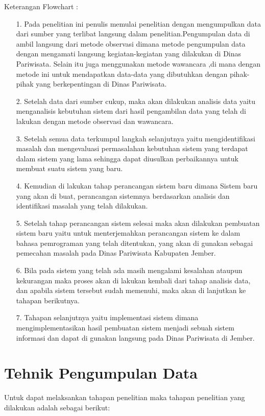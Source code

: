 \documentclass{jtetiproposalskripsi}
\begin{document}
Keterangan Flowchart :
\begin{itemize}
\item[1.] Pada penelitian  ini penulis memulai penelitian dengan mengumpulkan data dari sumber yang terlibat langsung dalam penelitian.Pengumpulan data di ambil langsung dari metode observasi dimana metode pengumpulan data dengan mengamati langsung kegiatan-kegiatan  yang dilakukan di Dinas Pariwisata. Selain itu juga menggunakan metode wawancara ,di mana dengan metode ini untuk mendapatkan data-data yang dibutuhkan dengan pihak-pihak yang berkepentingan di Dinas Pariwisata. 
\item[2.] Setelah data dari sumber cukup, maka akan dilakukan analisis data yaitu menganalisis  kebutuhan  sistem  dari hasil pengambilan data yang telah di lakukan dengan metode observasi dan wawancara. 
\item[3.]Setelah semua data terkumpul langkah selanjutnya yaitu mengidentifikasi masalah dan mengevaluasi  permasalahan  kebutuhan sistem yang terdapat dalam sistem yang lama  sehingga dapat diusulkan perbaikannya untuk membuat suatu sistem yang baru.
\item[4.]Kemudian di lakukan tahap perancangan sistem baru dimana Sistem baru yang akan di buat, perancangan sistemnya  berdasarkan  analisis  dan identifikasi masalah yang  telah dilakukan.
\item[5.]Setelah tahap perancangan sistem selesai maka akan dilakukan pembuatan sistem baru yaitu untuk  menterjemahkan  perancangan sistem  ke  dalam  bahasa  pemrograman  yang  telah ditentukan, yang akan di gunakan sebagai pemecahan masalah pada Dinas Pariwisata Kabupaten Jember.
\item[6.]Bila pada sistem yang telah ada masih mengalami kesalahan  ataupun kekurangan maka  proses akan di lakukan kembali dari tahap analisis data, dan apabila sistem tersebut sudah memenuhi, maka akan di lanjutkan ke tahapan berikutnya.
\item[7.]Tahapan selanjutnya yaitu implementasi sistem dimana mengimplementasikan  hasil  pembuatan sistem  menjadi  sebuah  sistem informasi dan dapat di gunakan langsung pada Dinas Pariwisata di Jember.
\end{itemize}

\section{Tehnik Pengumpulan Data}
Untuk dapat melaksankan tahapan penelitian maka tahapan penelitian yang dilakukan adalah sebagai berikut: 
\end{document}

